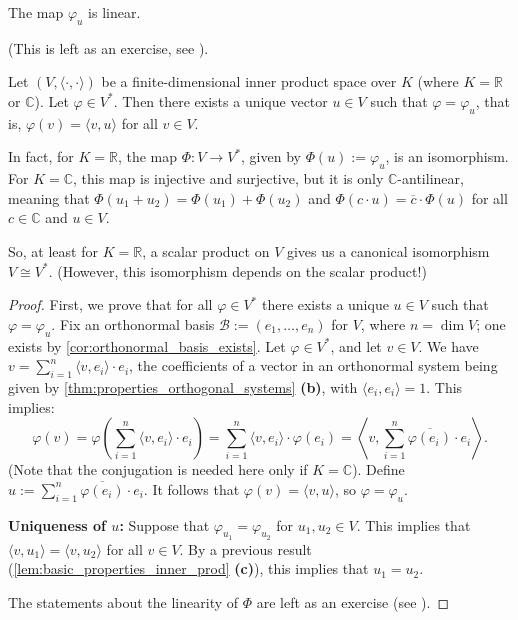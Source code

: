 \begin{claim*}
\label{claim:linearity_phi_u}
The map $\varphi_u$ is linear.
\end{claim*}
(This is left as an exercise, see ).

\begin{theorem}
\label{thm:dual_space_inner_product_isomorphism}
Let $(V, \langle \cdot, \cdot \rangle)$ be a finite-di\-men\-sional inner product space over $K$ (where $K = \mathbb{R}$ or $\mathbb{C}$). Let $\varphi \in V^*$. Then there exists a unique vector $u \in V$ such that $\varphi = \varphi_u$, that is, $\varphi(v) = \langle v, u \rangle$ for all $v \in V$.

In fact, for $K = \mathbb{R}$, the map $\Phi \colon V \to V^*$, given by $\Phi(u) := \varphi_u$, is an isomorphism. For $K = \mathbb{C}$, this map is injective and surjective, but it is only $\mathbb{C}$-antilinear, meaning that $\Phi(u_1+u_2) = \Phi(u_1)+\Phi(u_2)$ and $\Phi(c \cdot u) = \overline{c} \cdot \Phi(u)$ for all $c \in \mathbb{C}$ and $u \in V$.

So, at least for $K = \mathbb{R}$, a scalar product on $V$ gives us a canonical isomorphism $V \cong V^*$. (However, this isomorphism depends on the scalar product!)
\end{theorem}

\begin{proof}
First, we prove that for all $\varphi \in V^*$ there exists a unique $u \in V$ such that $\varphi = \varphi_u$.
Fix an orthonormal basis $\mathcal{B} := (e_1, \dots, e_n)$ for $V$, where $n = \dim V$; one exists by \cref{cor:orthonormal_basis_exists}.
Let $\varphi \in V^*$, and let $v \in V$. We have $v = \sum_{i=1}^n \langle v, e_i \rangle \cdot e_i$, the coefficients of a vector in an orthonormal system being given by \cref{thm:properties_orthogonal_systems} \textbf{(b)}, with $\langle e_i, e_i \rangle = 1$. This implies:
\[
    \varphi(v) = \varphi\left( \sum_{i=1}^n \langle v, e_i \rangle \cdot e_i \right) = \sum_{i=1}^n \langle v, e_i \rangle \cdot \varphi(e_i) = \left\langle v, \sum_{i=1}^n \overline{\varphi(e_i)} \cdot e_i \right\rangle.
\]
(Note that the conjugation is needed here only if $K = \mathbb{C}$).
Define $u := \sum_{i=1}^n \overline{\varphi(e_i)} \cdot e_i$. It follows that $\varphi(v) = \langle v, u \rangle$, so $\varphi = \varphi_u$.

\textbf{Uniqueness of $u$:} Suppose that $\varphi_{u_1} = \varphi_{u_2}$ for $u_1, u_2 \in V$. This implies that $\langle v, u_1 \rangle = \langle v, u_2 \rangle$ for all $v \in V$. By a previous result (\cref{lem:basic_properties_inner_prod} \textbf{(c)}), this implies that $u_1 = u_2$.

The statements about the linearity of $\Phi$ are left as an exercise (see ).
\end{proof}

